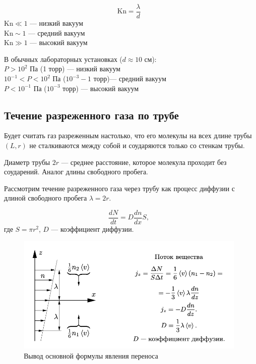 \documentclass[a4paper,12pt]{article} %
\begin{document}
\begin{equation}
  \text{Kn} = \frac{\lambda}{d}
\end{equation}
$\text{Kn} \ll 1$ — низкий вакуум \\
$\text{Kn} \sim 1$ — средний вакуум \\
$\text{Kn} \gg 1$ — высокий вакуум 

\smallskip

\noindent В обычных лабораторных установках ($d \approx 10$ см): \\
$P > 10^2$ Па (1 торр) — низкий вакуум \\
$10^{-1} < P < 10^2$ Па ($10^{-3}-1$ торр)— средний вакуум \\
$P < 10^{-1}$ Па ($10^{-3}$ торр) — высокий вакуум 

\subsection*{Течение разреженного газа по трубе}

Будет считать газ разреженным настолько, что его молекулы на всех длине трубы $(L, r)$ не сталкиваются между собой и соударяются только со стенкам трубы.

Диаметр трубы $2r$ — среднее расстояние, которое молекула  проходит без соударений. Аналог длины свободного пробега.

Рассмотрим течение разреженного газа через трубу как процесс диффузии с длиной свободного пробега $\lambda = 2r$. 

\begin{equation}
  \label{dN_dt}
  \frac{dN}{dt} = D \frac{dn}{dx} S,
\end{equation}
где $S = \pi r^2$, $D$ — коэффициент диффузии.

\begin{figure}
  \centering
  \includegraphics[scale = 0.75]{images/eq.png}
  \caption{Вывод основной формулы явления переноса}
  \label{fig:eq}
\end{figure}
\end{document}

